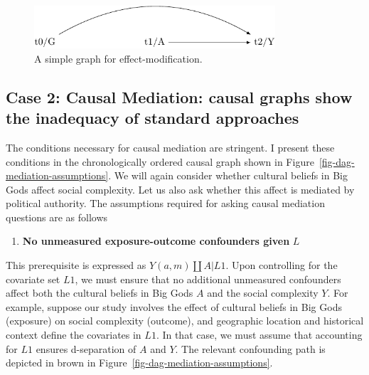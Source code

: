 \documentclass[
  singlecolumn]{report}
\providecommand{\tightlist}{%
  \setlength{\itemsep}{0pt}\setlength{\parskip}{0pt}}\usepackage{longtable,booktabs,array}
\begin{document}
\begin{figure}

{\centering \includegraphics[width=0.8\textwidth,height=\textheight]{causal-dags_files/figure-pdf/fig-dag-effect-modfication-1.pdf}

}

\caption{\label{fig-dag-effect-modfication}A simple graph for
effect-modification.}

\end{figure}

\hypertarget{case-2-causal-mediation-causal-graphs-show-the-inadequacy-of-standard-approaches}{%
\subsection{Case 2: Causal Mediation: causal graphs show the inadequacy
of standard
approaches}\label{case-2-causal-mediation-causal-graphs-show-the-inadequacy-of-standard-approaches}}

The conditions necessary for causal mediation are stringent. I present
these conditions in the chronologically ordered causal graph shown in
Figure~\ref{fig-dag-mediation-assumptions}. We will again consider
whether cultural beliefs in Big Gods affect social complexity. Let us
also ask whether this affect is mediated by political authority. The
assumptions required for asking causal mediation questions are as
follows

\begin{enumerate}
\def\labelenumi{\arabic{enumi}.}
\tightlist
\item
  \textbf{No unmeasured exposure-outcome confounders given} \(L\)
\end{enumerate}

This prerequisite is expressed as \(Y(a,m) \coprod A | L1\). Upon
controlling for the covariate set \(L1\), we must ensure that no
additional unmeasured confounders affect both the cultural beliefs in
Big Gods \(A\) and the social complexity \(Y\). For example, suppose our
study involves the effect of cultural beliefs in Big Gods (exposure) on
social complexity (outcome), and geographic location and historical
context define the covariates in \(L1\). In that case, we must assume
that accounting for \(L1\) ensures d-separation of \(A\) and \(Y\). The
relevant confounding path is depicted in brown in
Figure~\ref{fig-dag-mediation-assumptions}.
\end{document}
